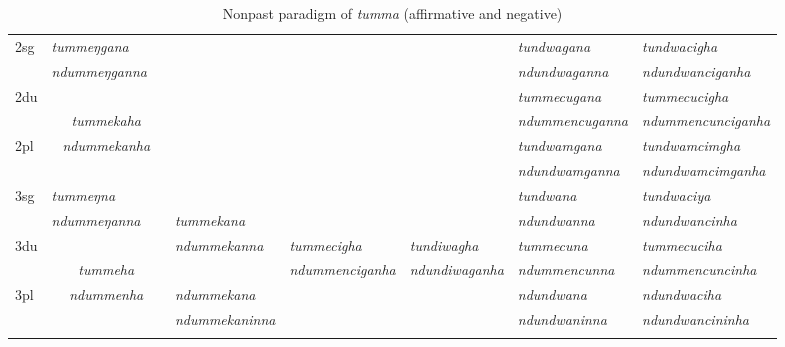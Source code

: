 \begin{sidewaystable}[p]
{{\begin{tabular}{l|p{2.4cm}|p{2.0cm}|p{2.6cm}|p{2.8cm}|p{2.6cm}|p{3.2cm}|p{3.2cm}}
\hline				
{\sc 2sg} 		&	\emph{tummeŋgana}  &	    & \multicolumn{3}{c|}{ \cellcolor[gray]{.8}}& \emph{tundwagana}  &   \emph{tundwacigha}\\
		&  \emph{ndummeŋganna} &  & \multicolumn{3}{c|}{ \cellcolor[gray]{.8}}&\emph{ ndundwaganna} &\emph{ndundwanciganha}  \\
 \cline{1-2} \cline{7-8}			
{\sc 2du}		&	\multicolumn{2}{c|}{}     & \multicolumn{3}{c|}{\cellcolor[gray]{.8}} & \emph{tummecugana}  &  \emph{tummecucigha} \\
		&  	\multicolumn{2}{c|}{\emph{tummekaha}} & \multicolumn{3}{c|}{\cellcolor[gray]{.8} }&\emph{ndummencuganna}  & \emph{ndummencunciganha} \\
 \cline{1-1} \cline{7-8}			
{\sc 2pl}		&	\multicolumn{2}{c|}{\emph{ndummekanha}} & \multicolumn{3}{c|}{ \cellcolor[gray]{.8}}& \emph{tundwamgana}& \emph{tundwamcimgha}  \\
		&	\multicolumn{2}{c|}{ }& \multicolumn{3}{c|}{\cellcolor[gray]{.8}}&\emph{ ndundwamganna} & \emph{ndundwamcimganha} \\
\hline			
{\sc 3sg} 		&\emph{tummeŋna}	  &	      	&  			&    &    	&\emph{tundwana}&\emph{tundwaciya}\\
		& \emph{ndummeŋanna}   &   	& \emph{tummekana}	&  &   &\emph{ndundwanna}&\emph{ndundwancinha}\\
  \cline{1-2}  \cline{7-8}					
{\sc 3du}& \multicolumn{2}{c|}{}&\emph{ndummekanna}& \emph{tummecigha}&\emph{tundiwagha}&  \emph{tummecuna} & \emph{ tummecuciha}\\
	& \multicolumn{2}{c|}{\emph{tummeha}}& &\emph{ndummenciganha}& \emph{ndundiwaganha} & \emph{ndummencunna} & \emph{ndummencuncinha}\\
 \cline{1-1} \cline{4-4} \cline{7-8}	
{\sc 3pl}&\multicolumn{2}{c|}{\emph{ndummenha}}	&\emph{ndummekana}& & &\emph{ndundwana}&\emph{ndundwaciha}\\	
	&\multicolumn{2}{c|}{ }&\emph{ndummekaninna}&& &\emph{ndundwaninna}&\emph{ndundwancininha} \\
\lspbottomrule
\end{tabular}
}
}
\caption{Nonpast paradigm of \emph{tumma}  (affirmative and negative)}\label{par-tund-npst}
\end{sidewaystable}



